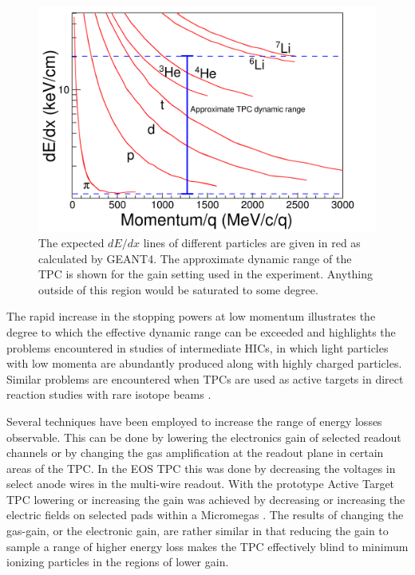\documentclass[review]{elsarticle}
\begin{document}
  
\begin{figure}[ht!]
\includegraphics[width=\linewidth]{intrographic}
\caption{The expected $dE/dx$ lines of different particles are given in red as calculated by GEANT4. The approximate dynamic range of the TPC is shown for the gain setting used in the experiment. Anything outside of this region would be saturated to some degree.}
\label{fig:intro}
\end{figure}

The rapid increase in the stopping powers at low momentum illustrates the degree to which the effective dynamic range can be exceeded and highlights the problems encountered in studies of intermediate HICs, in which light particles with low momenta are abundantly produced along with highly charged particles. Similar problems are encountered when TPCs are used as active targets in direct reaction studies with rare isotope beams \cite{pattpc}. 

Several techniques have been employed to increase the range of energy losses observable. This can be done by lowering the electronics gain of selected readout channels or by changing the gas amplification at the readout plane in certain areas of the TPC. In the EOS TPC \cite{eos} this was done by decreasing the voltages in select anode wires in the multi-wire readout. With the prototype Active Target TPC lowering or increasing the gain was achieved by decreasing or increasing the electric fields on selected pads within a Micromegas \cite{pattpc}. The results of changing the gas-gain, or the electronic gain, are rather similar in that reducing the gain to sample a range of higher energy loss makes the TPC effectively blind to minimum ionizing particles in  the regions of lower gain.
\end{document}
